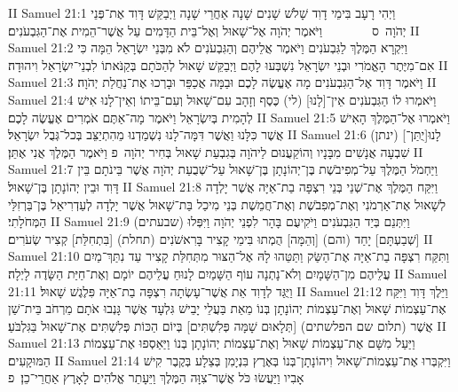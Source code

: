 II Samuel 21:1	וַיְהִי רָעָב בִּימֵי דָוִד שָׁלֹשׁ שָׁנִים שָׁנָה אַחֲרֵי שָׁנָה וַיְבַקֵּשׁ דָּוִד אֶת־פְּנֵי יְהֹוָה {ס}        וַיֹּאמֶר יְהֹוָה אֶל־שָׁאוּל וְאֶל־בֵּית הַדָּמִים עַל אֲשֶׁר־הֵמִית אֶת־הַגִּבְעֹנִים׃
II Samuel 21:2	וַיִּקְרָא הַמֶּלֶךְ לַגִּבְעֹנִים וַיֹּאמֶר אֲלֵיהֶם וְהַגִּבְעֹנִים לֹא מִבְּנֵי יִשְׂרָאֵל הֵמָּה כִּי אִם־מִיֶּתֶר הָאֱמֹרִי וּבְנֵי יִשְׂרָאֵל נִשְׁבְּעוּ לָהֶם וַיְבַקֵּשׁ שָׁאוּל לְהַכֹּתָם בְּקַנֹּאתוֹ לִבְנֵי־יִשְׂרָאֵל וִיהוּדָה׃
II Samuel 21:3	וַיֹּאמֶר דָּוִד אֶל־הַגִּבְעֹנִים מָה אֶעֱשֶׂה לָכֶם וּבַמָּה אֲכַפֵּר וּבָרְכוּ אֶת־נַחֲלַת יְהֹוָה׃
II Samuel 21:4	וַיֹּאמְרוּ לוֹ הַגִּבְעֹנִים אֵין־[לָנוּ] (לי) כֶּסֶף וְזָהָב עִם־שָׁאוּל וְעִם־בֵּיתוֹ וְאֵין־לָנוּ אִישׁ לְהָמִית בְּיִשְׂרָאֵל וַיֹּאמֶר מָה־אַתֶּם אֹמְרִים אֶעֱשֶׂה לָכֶם׃
II Samuel 21:5	וַיֹּאמְרוּ אֶל־הַמֶּלֶךְ הָאִישׁ אֲשֶׁר כִּלָּנוּ וַאֲשֶׁר דִּמָּה־לָנוּ נִשְׁמַדְנוּ מֵהִתְיַצֵּב בְּכל־גְּבֻל יִשְׂרָאֵל׃
II Samuel 21:6	(ינתן) [יֻתַּן־]לָנוּ שִׁבְעָה אֲנָשִׁים מִבָּנָיו וְהוֹקַעֲנוּם לַיהֹוָה בְּגִבְעַת שָׁאוּל בְּחִיר יְהֹוָה {פ} וַיֹּאמֶר הַמֶּלֶךְ אֲנִי אֶתֵּן׃
II Samuel 21:7	וַיַּחְמֹל הַמֶּלֶךְ עַל־מְפִיבֹשֶׁת בֶּן־יְהוֹנָתָן בֶּן־שָׁאוּל עַל־שְׁבֻעַת יְהֹוָה אֲשֶׁר בֵּינֹתָם בֵּין דָּוִד וּבֵין יְהוֹנָתָן בֶּן־שָׁאוּל׃
II Samuel 21:8	וַיִּקַּח הַמֶּלֶךְ אֶת־שְׁנֵי בְּנֵי רִצְפָּה בַת־אַיָּה אֲשֶׁר יָלְדָה לְשָׁאוּל אֶת־אַרְמֹנִי וְאֶת־מְפִבֹשֶׁת וְאֶת־חֲמֵשֶׁת בְּנֵי מִיכַל בַּת־שָׁאוּל אֲשֶׁר יָלְדָה לְעַדְרִיאֵל בֶּן־בַּרְזִלַּי הַמְּחֹלָתִי׃
II Samuel 21:9	וַיִּתְּנֵם בְּיַד הַגִּבְעֹנִים וַיֹּקִיעֻם בָּהָר לִפְנֵי יְהֹוָה וַיִּפְּלוּ (שבעתים) [שְׁבַעְתָּם] יָחַד (והם) [וְהֵמָּה] הֻמְתוּ בִּימֵי קָצִיר בָּרִאשֹׁנִים (תחלת) [בִּתְחִלַּת] קְצִיר שְׂעֹרִים׃
II Samuel 21:10	וַתִּקַּח רִצְפָּה בַת־אַיָּה אֶת־הַשַּׂק וַתַּטֵּהוּ לָהּ אֶל־הַצּוּר מִתְּחִלַּת קָצִיר עַד נִתַּךְ־מַיִם עֲלֵיהֶם מִן־הַשָּׁמָיִם וְלֹא־נָתְנָה עוֹף הַשָּׁמַיִם לָנוּחַ עֲלֵיהֶם יוֹמָם וְאֶת־חַיַּת הַשָּׂדֶה לָיְלָה׃
II Samuel 21:11	וַיֻּגַּד לְדָוִד אֵת אֲשֶׁר־עָשְׂתָה רִצְפָּה בַת־אַיָּה פִּלֶגֶשׁ שָׁאוּל׃
II Samuel 21:12	וַיֵּלֶךְ דָּוִד וַיִּקַּח אֶת־עַצְמוֹת שָׁאוּל וְאֶת־עַצְמוֹת יְהוֹנָתָן בְּנוֹ מֵאֵת בַּעֲלֵי יָבֵישׁ גִּלְעָד אֲשֶׁר גָּנְבוּ אֹתָם מֵרְחֹב בֵּית־שַׁן אֲשֶׁר (תלום שם הפלשתים) [תְּלָאוּם שָׁמָּה פְּלִשְׁתִּים] בְּיוֹם הַכּוֹת פְּלִשְׁתִּים אֶת־שָׁאוּל בַּגִּלְבֹּעַ׃
II Samuel 21:13	וַיַּעַל מִשָּׁם אֶת־עַצְמוֹת שָׁאוּל וְאֶת־עַצְמוֹת יְהוֹנָתָן בְּנוֹ וַיַּאַסְפוּ אֶת־עַצְמוֹת הַמּוּקָעִים׃
II Samuel 21:14	וַיִּקְבְּרוּ אֶת־עַצְמוֹת־שָׁאוּל וִיהוֹנָתָן־בְּנוֹ בְּאֶרֶץ בִּנְיָמִן בְּצֵלָע בְּקֶבֶר קִישׁ אָבִיו וַיַּעֲשׂוּ כֹּל אֲשֶׁר־צִוָּה הַמֶּלֶךְ וַיֵּעָתֵר אֱלֹהִים לָאָרֶץ אַחֲרֵי־כֵן׃ {פ}
